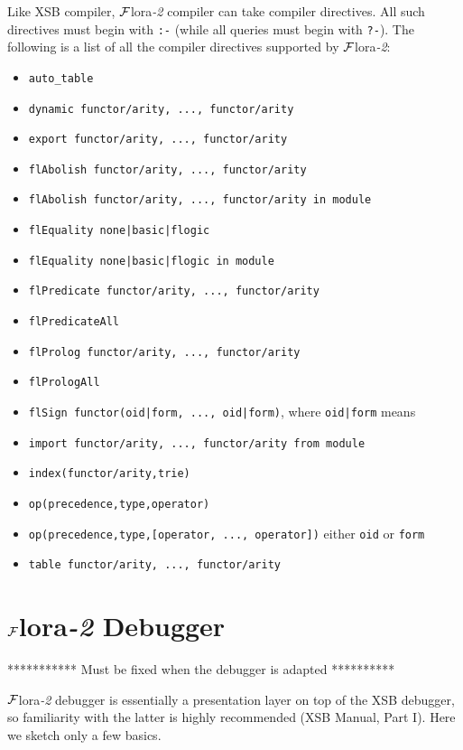 \documentclass[11pt]{article}
\newcommand{\FLORA}{{\mbox{${\cal F}${\sc lora}\rm\emph{-2}}}\xspace}
\begin{document}
%
%
Like XSB compiler, \FLORA compiler can take compiler directives. All
such directives must begin with {\tt :-} (while all queries must begin with
{\tt ?-}). The following is a list of all the compiler directives supported
by \FLORA:
\begin{itemize}
\item \verb!auto_table!
\item \verb!dynamic functor/arity, ..., functor/arity!
\item \verb!export functor/arity, ..., functor/arity!
\item \verb!flAbolish functor/arity, ..., functor/arity!
\item \verb!flAbolish functor/arity, ..., functor/arity in module!
\item \verb!flEquality none|basic|flogic!
\item \verb!flEquality none|basic|flogic in module!
\item \verb!flPredicate functor/arity, ..., functor/arity!
\item \verb!flPredicateAll!
\item \verb!flProlog functor/arity, ..., functor/arity!
\item \verb!flPrologAll!
\item \verb!flSign functor(oid|form, ..., oid|form)!, where \verb!oid|form! means
\item \verb!import functor/arity, ..., functor/arity from module!
\item \verb!index(functor/arity,trie)!
\item \verb!op(precedence,type,operator)!
\item \verb!op(precedence,type,[operator, ..., operator])!
      either \verb|oid| or \verb!form!
\item \verb!table functor/arity, ..., functor/arity!
\end{itemize}


\section{\FLORA Debugger}


*********** Must be fixed when the debugger is adapted **********


\FLORA debugger is essentially a presentation layer on top of the XSB
debugger, so familiarity with the latter is highly recommended (XSB Manual,
Part I). Here we sketch only a few basics.
\end{document}
